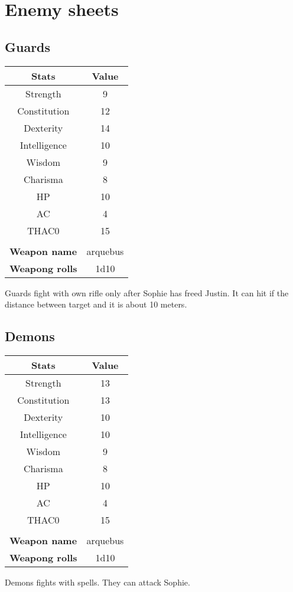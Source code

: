 \section{Enemy sheets}
\subsection{Guards}
\begin{table}[H]
  \centering
\begin{tabular}{|c|c|}
\hline
\rowcolor[HTML]{C0C0C0} 
\textbf{Stats} & \textbf{Value} \\ \hline
Strength & 9 \\ \hline
Constitution & 12 \\ \hline
Dexterity & 14 \\ \hline
Intelligence & 10 \\ \hline
Wisdom & 9 \\ \hline
Charisma & 8 \\ \hline
HP & 10 \\ \hline
AC & 4 \\ \hline
THAC0 & 15 \\ \hline
\multicolumn{2}{|l|}{} \\ \hline
\multicolumn{1}{|l|}{\cellcolor[HTML]{9B9B9B}\textbf{Weapon name}} & \multicolumn{1}{c|}{arquebus} \\ \hline
\multicolumn{1}{|l|}{\cellcolor[HTML]{9B9B9B}\textbf{Weapong rolls}} & \multicolumn{1}{c|}{1d10} \\ \hline
\end{tabular}
\end{table}
Guards fight with own rifle only after Sophie has freed Justin. It can hit if the distance between target and it is about 10 meters. 
\subsection{Demons}
\begin{table}[H]
  \centering
\begin{tabular}{|c|c|}
\hline
\rowcolor[HTML]{C0C0C0} 
\textbf{Stats} & \textbf{Value} \\ \hline
Strength & 13 \\ \hline
Constitution & 13 \\ \hline
Dexterity & 10 \\ \hline
Intelligence & 10 \\ \hline
Wisdom & 9 \\ \hline
Charisma & 8 \\ \hline
HP & 10 \\ \hline
AC & 4 \\ \hline
THAC0 & 15 \\ \hline
\multicolumn{2}{|l|}{} \\ \hline
\multicolumn{1}{|l|}{\cellcolor[HTML]{9B9B9B}\textbf{Weapon name}} & \multicolumn{1}{c|}{arquebus} \\ \hline
\multicolumn{1}{|l|}{\cellcolor[HTML]{9B9B9B}\textbf{Weapong rolls}} & \multicolumn{1}{c|}{1d10} \\ \hline
\end{tabular}
\end{table}
Demons fights with spells. They can attack Sophie.

